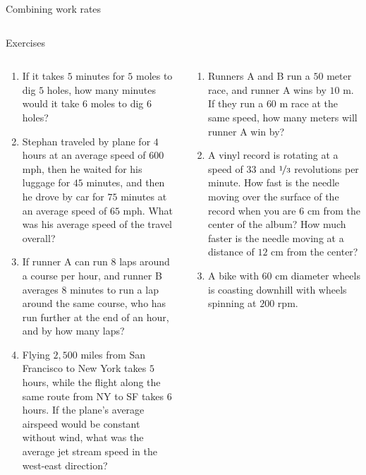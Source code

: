 \documentclass[9pt,aspectratio=169]{beamer}
\begin{document}
\begin{frame}{Combining work rates}
\begin{columns}[T]
\begin{column}{0.5\textwidth}
    \end{column}
  \end{columns}
\end{frame}

\begin{frame}{Exercises}
  \begin{columns}[T]
    \begin{column}{0.5\textwidth}
      \setlength{\leftmargini}{0.2cm}
      \begin{enumerate}
        \item If it takes $5$ minutes for $5$ moles to dig $5$ holes, how many minutes would it take $6$ moles to dig $6$ holes?
        \item Stephan traveled by plane for $4$ hours at an average speed of $600$ mph, then he waited for his luggage for $45$ minutes, and then he drove by car for $75$ minutes at an average speed of $65$ mph. What was his average speed of the travel overall? 
        \item If runner A can run $8$ laps around a course per hour, and runner B averages $8$ minutes to run a lap around the same course, who has run further at the end of an hour, and by how many laps?
        \item Flying $2{,}500$ miles from San Francisco to New York takes $5$ hours, while the flight along the same route from NY to SF takes $6$ hours.  If the plane’s average airspeed would be constant without wind, what was the average jet stream speed in the west-east direction?
        \seti
      \end{enumerate}
    \end{column}
    \begin{column}{0.5\textwidth}
      \setlength{\leftmargini}{-0.1cm}
      \begin{enumerate}
        \conti
        \item Runners A and B run a $50$ meter race, and runner A wins by $10$ m.  If they run a $60$ m race at the same speed, how many meters will runner A win by?
        \item A vinyl record is rotating at a speed of $33$ and $\nicefrac{1}{3}$ revolutions per minute.  How fast is the needle moving over the surface of the record when you are $6$ cm from the center of the album?  How much faster is the needle moving at a distance of $12$ cm from the center?
        \item A bike with $60$ cm diameter wheels is coasting downhill with wheels spinning at $200$ rpm.\\ 

\end{enumerate}
\end{column}
\end{columns}
\end{frame}
\end{document}
